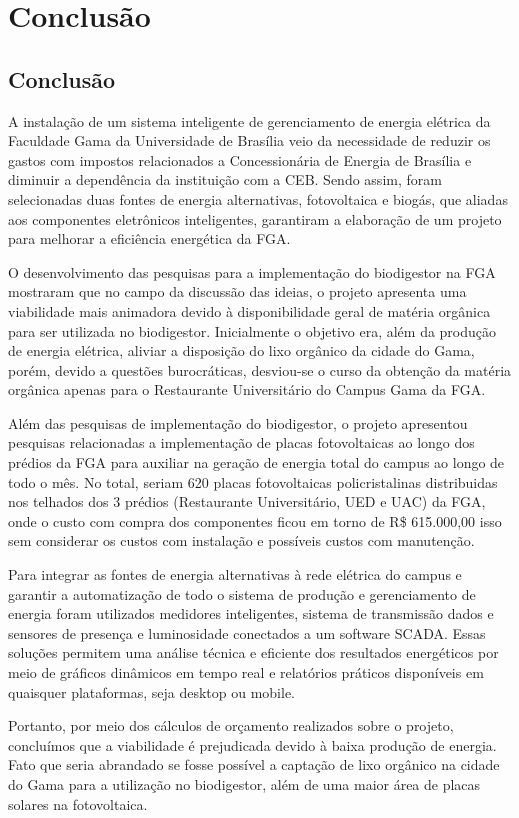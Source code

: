 \part{Conclusão}
\chapter[Conclusão]{Conclusão}
A instalação de um sistema inteligente de gerenciamento de energia elétrica da Faculdade Gama da Universidade de Brasília veio da necessidade de reduzir os gastos com impostos relacionados a Concessionária de Energia de Brasília e diminuir a dependência da instituição com a CEB. Sendo assim, foram selecionadas duas fontes de energia alternativas, fotovoltaica e biogás, que aliadas aos componentes eletrônicos inteligentes, garantiram a elaboração de um projeto para melhorar a eficiência energética da FGA.

O desenvolvimento das pesquisas para a implementação do biodigestor na FGA mostraram que no campo da discussão das ideias, o projeto apresenta uma viabilidade mais animadora devido à disponibilidade geral de matéria orgânica para ser utilizada no biodigestor. Inicialmente o objetivo era, além da produção de energia elétrica, aliviar a disposição do lixo orgânico da cidade do Gama, porém, devido a questões burocráticas, desviou-se o curso da obtenção da matéria orgânica apenas para o Restaurante Universitário do Campus Gama da FGA.

Além das pesquisas de implementação do biodigestor, o projeto apresentou pesquisas relacionadas a implementação de  placas fotovoltaicas ao longo dos prédios da FGA para auxiliar na geração de energia total do campus ao longo de todo o mês. No total, seriam 620 placas fotovoltaicas policristalinas distribuidas nos telhados dos 3 prédios (Restaurante Universitário, UED e UAC) da FGA, onde o custo com compra dos componentes ficou em torno de R\$ 615.000,00 isso sem considerar os custos com instalação e possíveis custos com manutenção.

Para integrar as fontes de energia alternativas à rede elétrica do campus e garantir a automatização de todo o sistema de produção e gerenciamento de energia foram utilizados medidores inteligentes, sistema de transmissão dados e sensores de presença e luminosidade conectados a um software SCADA. Essas soluções permitem uma análise técnica e eficiente dos resultados energéticos por meio de gráficos dinâmicos em tempo real e relatórios práticos disponíveis em quaisquer plataformas, seja desktop ou mobile. 

Portanto, por meio dos cálculos de orçamento realizados sobre o projeto, concluímos que a viabilidade é prejudicada devido à baixa produção de energia. Fato que seria abrandado se fosse possível a captação de lixo orgânico na cidade do Gama para a utilização no biodigestor, além de uma maior área de placas solares na fotovoltaica. 
